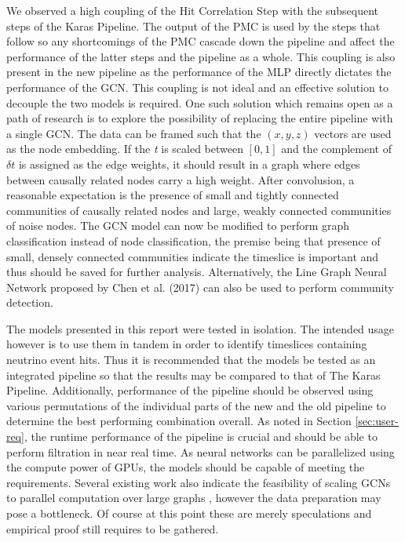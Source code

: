 We observed a high coupling of the Hit Correlation Step with the
subsequent steps of the Karas Pipeline. The output of the PMC is used
by the steps that follow so any shortcomings of the PMC cascade down
the pipeline and affect the performance of the latter steps and the
pipeline as a whole. This coupling is also present in the new pipeline
as the performance of the MLP directly dictates the performance of the
GCN. This coupling is not ideal and an effective solution to decouple
the two models is required. One such solution which remains open as a
path of research is to explore the possibility of replacing the entire
pipeline with a single GCN. The data can be framed such that the $(x,
y, z)$ vectors are used as the node embedding. If the \emph{t} is
scaled between $[0, 1]$ and the complement of $\delta t$ is assigned
as the edge weights, it should result in a graph where edges between
causally related nodes carry a high weight. After convolusion, a
reasonable expectation is the presence of small and tightly connected
communities of causally related nodes and large, weakly connected
communities of noise nodes. The GCN model can now be modified to
perform graph classification \cite{zhang2018end} instead of node
classification, the premise being that presence of small, densely
connected communities indicate the timeslice is important and thus
should be saved for further analysis. Alternatively, the Line Graph
Neural Network proposed by Chen et al. (2017) can also be used to
perform community detection.

The models presented in this report were tested in isolation. The
intended usage however is to use them in tandem in order to identify
timeslices containing neutrino event hits. Thus it is recommended that
the models be tested as an integrated pipeline so that the results may
be compared to that of The Karas Pipeline. Additionally, performance
of the pipeline should be observed using various permutations of the
individual parts of the new and the old pipeline to determine the best
performing combination overall. As noted in Section
\ref{sec:user-req}, the runtime performance of the pipeline is crucial
and should be able to perform filtration in near real time. As neural
networks can be parallelized using the compute power of GPUs, the
models should be capable of meeting the requirements. Several existing
work also indicate the feasibility of scaling GCNs to parallel
computation over large graphs \cite{ma2019high, ma2019neugraph,
  zeng2019accurate}, however the data preparation may pose a
bottleneck. Of course at this point these are merely speculations and
empirical proof still requires to be gathered.

